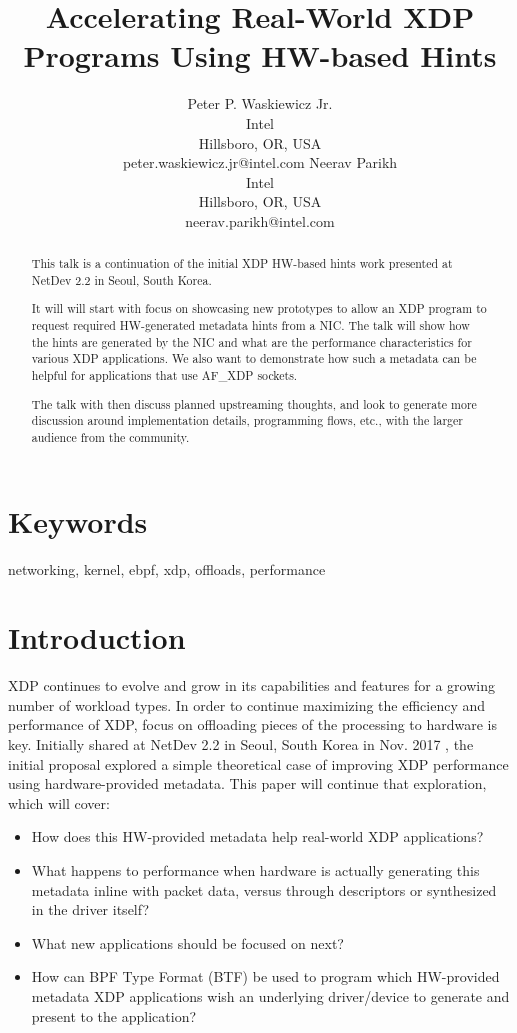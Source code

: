 \documentclass[letterpaper]{article}
\title{Accelerating Real-World XDP Programs Using HW-based Hints}
\author{Peter P. Waskiewicz Jr. \\ Intel \\ Hillsboro, OR, USA \\ peter.waskiewicz.jr@intel.com
\And Neerav Parikh \\ Intel \\ Hillsboro, OR, USA \\ neerav.parikh@intel.com
\newline
\newline
}
\begin{document}
 
\maketitle
\begin{abstract}
This talk is a continuation of the initial XDP HW-based hints work presented at NetDev 2.2 in Seoul, South Korea.

It will will start with focus on showcasing new prototypes to allow an XDP program to request required HW-generated metadata hints from a NIC. The talk will show how the hints are generated by the NIC and what are the performance characteristics for various XDP applications. We also want to demonstrate how such a metadata can be helpful for applications that use AF\_XDP sockets.

The talk with then discuss planned upstreaming thoughts, and look to generate more discussion around implementation details, programming flows, etc., with the larger audience from the community.
\end{abstract}

\section{Keywords}

networking, kernel, ebpf, xdp, offloads, performance

\section{Introduction}
XDP continues to evolve and grow in its capabilities and features for a growing number of workload types.  In order to continue maximizing the efficiency and performance of XDP, focus on offloading pieces of the processing to hardware is key.  Initially shared at NetDev 2.2 in Seoul, South Korea in Nov. 2017 \cite{xdp-acceleration-2017}, the initial proposal explored a simple theoretical case of improving XDP performance using hardware-provided metadata.  This paper will continue that exploration, which will cover:
\begin{itemize}
\item How does this HW-provided metadata help real-world XDP applications?
\item What happens to performance when hardware is actually generating this metadata inline with packet data, versus through descriptors or synthesized in the driver itself?
\item What new applications should be focused on next?
\item How can BPF Type Format (BTF) be used to program which HW-provided metadata XDP applications wish an underlying driver/device to generate and present to the application?
\end{itemize}
\end{document}
